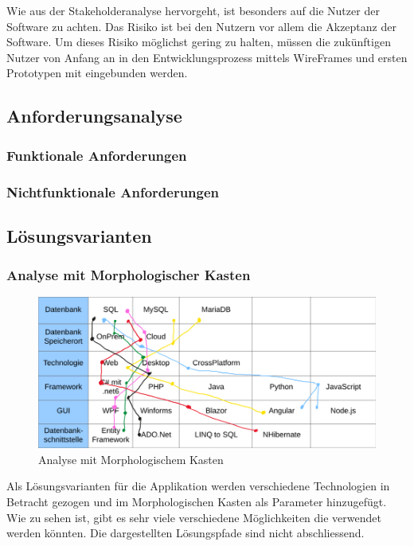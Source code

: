 Wie aus der Stakeholderanalyse hervorgeht, ist besonders auf die Nutzer der Software zu achten. Das Risiko ist bei den Nutzern vor allem die Akzeptanz der Software. Um dieses Risiko möglichst gering zu halten, müssen die zukünftigen Nutzer von Anfang an in den Entwicklungsprozess mittels WireFrames und ersten Prototypen mit eingebunden werden.

\subsection{Anforderungsanalyse}
\subsubsection{Funktionale Anforderungen}


\subsubsection{Nichtfunktionale Anforderungen}


\subsection{Lösungsvarianten}
\subsubsection{Analyse mit Morphologischer Kasten}
\begin{figure}[H]
  \begin{center}
    \includegraphics[width=1\linewidth]{content/images/morphoKasten.png}
    \caption{Analyse mit Morphologischem Kasten}
    \label{morphoKasten}
  \end{center}
\end{figure}

Als Lösungsvarianten für die Applikation werden verschiedene Technologien in Betracht gezogen und im Morphologischen Kasten als Parameter hinzugefügt. Wie zu sehen ist, gibt es sehr viele verschiedene Möglichkeiten die verwendet werden könnten. Die dargestellten Lösungspfade sind nicht abschliessend.

